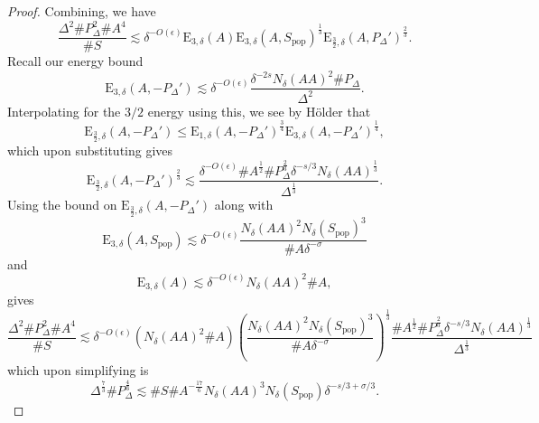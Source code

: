 \documentclass[10pt,a4paper]{amsart}
\begin{document}
\begin{proof}
Combining, we have
\[
	\frac{\Delta ^{2} \# P_{\Delta} ^{2} \# A ^{4} }{\# S} \lesssim \delta^{- O(\epsilon)}\mathrm{E} _{3,\delta} (A) \mathrm{E} _{3,\delta} (A,S_{\text{pop}} )^{\frac{1}{3} } \mathrm{E} _{\frac{3}{2}  ,\delta} (A,P_{\Delta} ')^{\frac{2}{3} }
.\]
Recall our energy bound
\[
	\mathrm{E} _{3,\delta} (A,- P_{\Delta} ')\lesssim \delta^{-O(\epsilon)} \frac{\delta^{-2s} N_{\delta} (AA)^{2} \# P_{\Delta} }{\Delta^{2}} 
.\]
Interpolating for the \(3/2\) energy using this, we see by H\"older that
\[
	\mathrm{E} _{\frac{3}{2} ,\delta} (A, - P_{\Delta} ') \leq \mathrm{E} _{1,\delta} (A , - P_{\Delta} ')^{\frac{3}{4} } \mathrm{E} _{3,\delta} (A , - P_{\Delta} ')^{\frac{1}{4} }
,\]
which upon substituting gives
\[
	\mathrm{E} _{\frac{3}{2} ,\delta} (A, -P_{\Delta} ')^{\frac{2}{3} } \lesssim \frac{ \delta^{- O(\epsilon)} \# A^{\frac{1}{2} } \# P_{\Delta} ^{\frac{2}{3} } \delta^{- s / 3} N_{\delta} (AA)^{\frac{1}{3} }}{\Delta^{\frac{1}{3} }} 
.\]
Using the bound on \(\mathrm{E} _{\frac{3}{2} , \delta} (A, - P_{\Delta} ')\) along with
\[
	\mathrm{E}_{3, \delta}\left(A, S_{\mathrm{pop}}\right) \lesssim \delta^{-O(\epsilon)} \frac{N_\delta(A A)^2 N_\delta\left(S_{\mathrm{pop}}\right)^3}{\# A \delta^{-\sigma}}
\]
and
\[
	\mathrm{E}_{3, \delta}(A) \lesssim \delta^{-O(\epsilon)} N_\delta(A A)^2 \# A,
\]
gives
\[
	\frac{\Delta ^{2} \# P_{\Delta} ^{2} \# A ^{4}}{\# S} \lesssim \delta^{- O(\epsilon)} \left( N_\delta(A A)^2 \# A \right) \left( \frac{N_\delta(A A)^2 N_\delta\left(S_{\mathrm{pop}}\right)^3}{\# A \delta^{-\sigma}} \right) ^{\frac{1}{3} }  \frac{ \# A^{\frac{1}{2} } \# P_{\Delta} ^{\frac{2}{3} } \delta^{- s / 3} N_{\delta} (AA)^{\frac{1}{3} }}{\Delta^{\frac{1}{3} }} 
\]
which upon simplifying is
\[
	\Delta ^{\frac{7}{3} } \# P_{\Delta} ^{\frac{4}{3} }  \lesssim \# S\# A ^{- \frac{17}{6} }  N_{\delta} (AA)^{3} N_{\delta} (S_{\text{pop}} )   \delta^{ - s / 3 + \sigma / 3   }
.\]


\end{proof}
\end{document}
